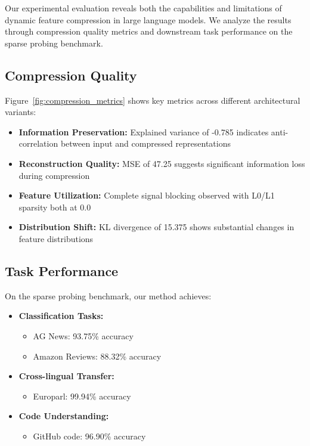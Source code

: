 \documentclass{article} %
\begin{document}
Our experimental evaluation reveals both the capabilities and limitations of dynamic feature compression in large language models. We analyze the results through compression quality metrics and downstream task performance on the sparse probing benchmark.

\subsection{Compression Quality}

Figure~\ref{fig:compression_metrics} shows key metrics across different architectural variants:

\begin{itemize}
    \item \textbf{Information Preservation:} Explained variance of -0.785 indicates anti-correlation between input and compressed representations
    \item \textbf{Reconstruction Quality:} MSE of 47.25 suggests significant information loss during compression
    \item \textbf{Feature Utilization:} Complete signal blocking observed with L0/L1 sparsity both at 0.0
    \item \textbf{Distribution Shift:} KL divergence of 15.375 shows substantial changes in feature distributions
\end{itemize}

\subsection{Task Performance}

On the sparse probing benchmark, our method achieves:

\begin{itemize}
    \item \textbf{Classification Tasks:}
    \begin{itemize}
        \item AG News: 93.75\% accuracy
        \item Amazon Reviews: 88.32\% accuracy
    \end{itemize}
    \item \textbf{Cross-lingual Transfer:}
    \begin{itemize}
        \item Europarl: 99.94\% accuracy
    \end{itemize}
    \item \textbf{Code Understanding:}
    \begin{itemize}
        \item GitHub code: 96.90\% accuracy
    \end{itemize}
\end{itemize}
\end{document}
